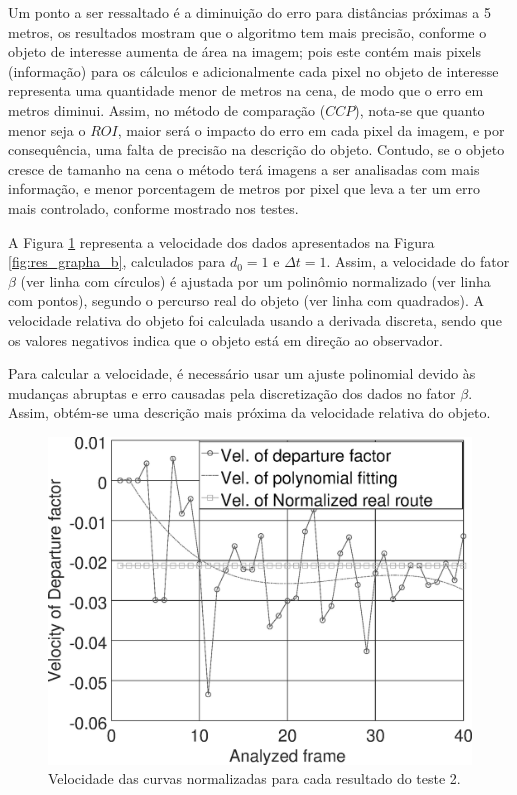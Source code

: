 Um ponto a ser ressaltado é a diminuição do erro para distâncias próximas a 5 metros,  
os resultados mostram que o algoritmo tem mais precisão, conforme o objeto de interesse 
aumenta de área na imagem; pois este contém mais pixels (informação)
para os cálculos e adicionalmente cada pixel no objeto de interesse 
representa uma quantidade menor de metros na cena, de modo que
o erro em metros diminui.
Assim, no método de comparação ($CCP$), nota-se que quanto menor seja o $ROI$, 
maior será o impacto do erro em cada pixel da imagem, 
e por consequência, uma falta de precisão na descrição do objeto. Contudo, se o objeto cresce de tamanho na cena
o método terá imagens a ser analisadas com mais informação, e menor porcentagem de metros por pixel
que leva a ter um erro mais controlado, conforme
mostrado nos testes. 

A Figura \ref{fig:res_grapha_bv} representa a velocidade dos dados apresentados 
na Figura \ref{fig:res_grapha_b}, calculados para $d_0=1$ e $\Delta t=1$.
Assim, a velocidade do fator $\beta$ (ver linha com círculos) é ajustada por um polinômio
normalizado (ver linha com pontos), segundo o percurso real do objeto (ver linha com quadrados).
A velocidade relativa do objeto foi calculada usando a derivada
discreta, sendo que os valores negativos indica que o objeto está
em direção ao observador.

Para calcular a velocidade, é necessário usar um ajuste polinomial devido 
às mudanças abruptas e erro causadas pela discretização dos dados no fator $\beta$.
Assim, obtém-se uma descrição mais próxima da velocidade relativa do 
objeto.

\begin{figure}[H]
\includegraphics[width=\columnwidth]{images/graphvelocity.eps}
\caption{Velocidade das curvas normalizadas para cada resultado do teste 2.}
\label{fig:res_grapha_bv}
\end{figure}

